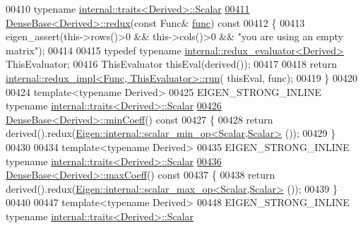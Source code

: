\begin{DoxyCode}
00410 \textcolor{keyword}{typename} \hyperlink{struct_eigen_1_1internal_1_1traits}{internal::traits<Derived>::Scalar}
\hyperlink{group___core___module_ad2ab5a8020dcd9d5986cb20d8a7ab213}{00411} \hyperlink{group___core___module_class_eigen_1_1_dense_base}{DenseBase<Derived>::redux}(\textcolor{keyword}{const} Func& \hyperlink{structfunc}{func})\textcolor{keyword}{ const}
00412 \textcolor{keyword}{}\{
00413   eigen\_assert(this->rows()>0 && this->cols()>0 && \textcolor{stringliteral}{"you are using an empty matrix"});
00414 
00415   \textcolor{keyword}{typedef} \textcolor{keyword}{typename} \hyperlink{class_eigen_1_1internal_1_1redux__evaluator}{internal::redux\_evaluator<Derived>} ThisEvaluator;
00416   ThisEvaluator thisEval(derived());
00417   
00418   \textcolor{keywordflow}{return} \hyperlink{struct_eigen_1_1internal_1_1redux__impl}{internal::redux\_impl<Func, ThisEvaluator>::run}(
      thisEval, func);
00419 \}
00420 
00424 \textcolor{keyword}{template}<\textcolor{keyword}{typename} Derived>
00425 EIGEN\_STRONG\_INLINE \textcolor{keyword}{typename} \hyperlink{struct_eigen_1_1internal_1_1traits}{internal::traits<Derived>::Scalar}
\hyperlink{group___core___module_a6634944be3d4fef551b57ffad30467f2}{00426} \hyperlink{group___core___module_a6634944be3d4fef551b57ffad30467f2}{DenseBase<Derived>::minCoeff}()\textcolor{keyword}{ const}
00427 \textcolor{keyword}{}\{
00428   \textcolor{keywordflow}{return} derived().redux(\hyperlink{struct_eigen_1_1internal_1_1scalar__min__op}{Eigen::internal::scalar\_min\_op<Scalar,Scalar>}
      ());
00429 \}
00430 
00434 \textcolor{keyword}{template}<\textcolor{keyword}{typename} Derived>
00435 EIGEN\_STRONG\_INLINE \textcolor{keyword}{typename} \hyperlink{struct_eigen_1_1internal_1_1traits}{internal::traits<Derived>::Scalar}
\hyperlink{group___core___module_ac0d151ec47eb7a44a3a5ba1587ddbeb4}{00436} \hyperlink{group___core___module_ac0d151ec47eb7a44a3a5ba1587ddbeb4}{DenseBase<Derived>::maxCoeff}()\textcolor{keyword}{ const}
00437 \textcolor{keyword}{}\{
00438   \textcolor{keywordflow}{return} derived().redux(\hyperlink{struct_eigen_1_1internal_1_1scalar__max__op}{Eigen::internal::scalar\_max\_op<Scalar,Scalar>}
      ());
00439 \}
00440 
00447 \textcolor{keyword}{template}<\textcolor{keyword}{typename} Derived>
00448 EIGEN\_STRONG\_INLINE \textcolor{keyword}{typename} \hyperlink{struct_eigen_1_1internal_1_1traits}{internal::traits<Derived>::Scalar}

\end{DoxyCode}
